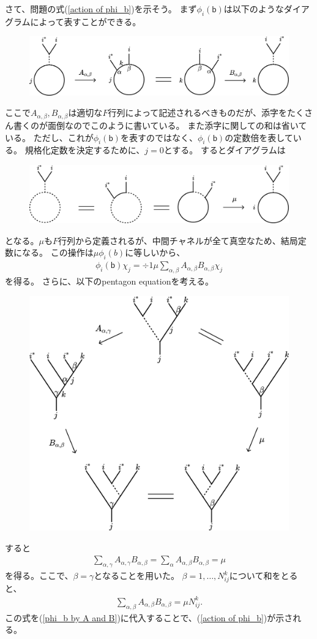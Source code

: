 \documentclass{jlreq}
\begin{document}
さて、問題の式(\ref{action of phi_b})を示そう。
まず$ϕ_i(𝖻)$は以下のようなダイアグラムによって表すことができる。
\begin{figure}[H]
    \centering
    \includegraphics[width=0.8\hsize]{phi_a chi_j}
\end{figure}
ここで$A_{α, β}, B_{α, β}$は適切な$F$行列によって記述されるべきものだが、添字をたくさん書くのが面倒なのでこのように書いている。
また添字に関しての和は省いている。
ただし、これが$ϕ_i(𝖻)$を表すのではなく、$ϕ_i(𝖻)$の定数倍を表している。
規格化定数を決定するために、$j=0$とする。
するとダイアグラムは
\begin{figure}[H]
    \centering
    \includegraphics[width=0.8\hsize]{phi_a chi_0}
\end{figure}
となる。$μ$も$F$行列から定義されるが、中間チャネルが全て真空なため、結局定数になる。
この操作は$μϕ_i(b)$に等しいから、
\begin{align}
    ϕ_i(𝖻)χ_j = ÷1{μ} ∑_{α, β} A_{α, β}B_{α, β} χ_j
    \label{phi_b by A and B}
\end{align}
を得る。
さらに、以下のpentagon equationを考える。
\begin{figure}[H]
    \centering
    \includegraphics[width=0.7\hsize]{pentagon}
\end{figure}
すると
\begin{align}
    ∑_{α, γ}A_{α,γ}B_{α,β} = ∑_{α}A_{α, β}B_{α, β}
    = μ
\end{align}
を得る。ここで、$β=γ$となることを用いた。
$β=1,…,N_{ij}^k$について和をとると、
\begin{align}
    ∑_{α, β}A_{α, β}B_{α, β} = μN_{ij}^k.
\end{align}
この式を(\ref{phi_b by A and B})に代入することで、(\ref{action of phi_b})が示される。
\end{document}
